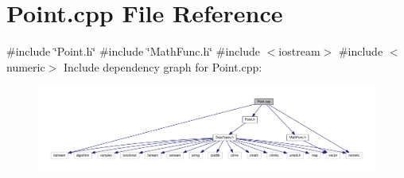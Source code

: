 \section{Point.\+cpp File Reference}
\label{_point_8cpp}
{\ttfamily \#include \char`\"{}Point.\+h\char`\"{}}\newline
{\ttfamily \#include \char`\"{}Math\+Func.\+h\char`\"{}}\newline
{\ttfamily \#include $<$iostream$>$}\newline
{\ttfamily \#include $<$numeric$>$}\newline
Include dependency graph for Point.\+cpp\+:
\nopagebreak
\begin{figure}[H]
\begin{center}
\leavevmode
\includegraphics[width=350pt]{_point_8cpp__incl}
\end{center}
\end{figure}
